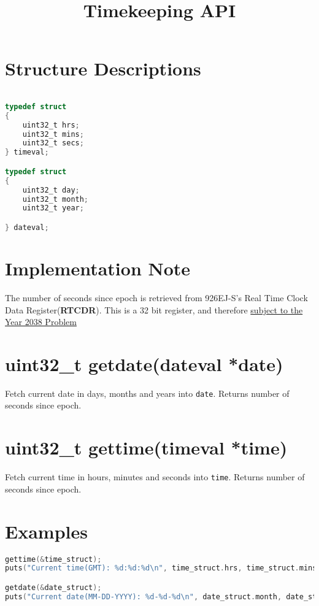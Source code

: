 \documentclass{article}
\title{Timekeeping API}
\date{}
\begin{document}
\maketitle

\section*{Structure Descriptions}

\begin{lstlisting}[language=C]

typedef struct
{
    uint32_t hrs;
    uint32_t mins;
    uint32_t secs;
} timeval;

typedef struct
{
    uint32_t day;
    uint32_t month;
    uint32_t year;

} dateval;

\end{lstlisting}

\section*{Implementation Note}

The number of seconds since epoch is retrieved from 926EJ-S's Real Time Clock Data Register(\textbf{RTCDR}). This is a 32 bit register, and therefore \underline{subject to the Year 2038 Problem}

\section*{uint32_t getdate(dateval *date)}

Fetch current date in days, months and years into \texttt{date}. Returns number of seconds since epoch.

\section*{uint32_t gettime(timeval *time)}

Fetch current time in hours, minutes and seconds into \texttt{time}. Returns number of seconds since epoch.

\section*{Examples}

\begin{lstlisting}[language=C,showstringspaces=false]
gettime(&time_struct);
puts("Current time(GMT): %d:%d:%d\n", time_struct.hrs, time_struct.mins, time_struct.secs);

getdate(&date_struct);
puts("Current date(MM-DD-YYYY): %d-%d-%d\n", date_struct.month, date_struct.day, date_struct.year);
\end{lstlisting}
\end{document}
